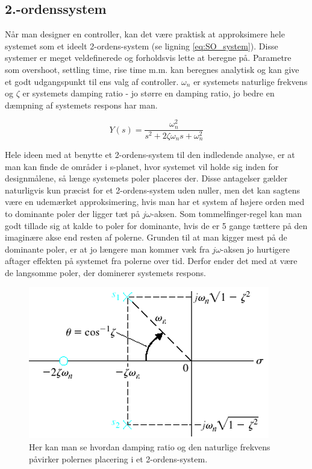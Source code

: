 \subsection{2.-ordenssystem}

Når man designer en controller, kan det være praktisk at approksimere hele systemet som et ideelt 2-ordens-system (se ligning \ref{eq:SO_system}). Disse systemer er meget veldefinerede og forholdsvis lette at beregne på. Parametre som overshoot, settling time, rise time m.m. kan beregnes analytisk og kan give et godt udgangspunkt til ens valg af controller. $\omega_{n}$ er systemets naturlige frekvens og $\zeta$ er systemets damping ratio - jo større en damping ratio, jo bedre en dæmpning af systemets respons har man.

\begin{equation}\label{eq:SO_system}
Y(s)=\frac{\omega_{n}^2}{s^2+2\zeta\omega_{n}s+\omega_{n}^2}
\end{equation}

Hele ideen med at benytte et 2-ordens-system til den indledende analyse, er at man kan finde de områder i s-planet, hvor systemet vil holde sig inden for designmålene, så længe systemets poler placeres der. Disse antagelser gælder naturligvis kun præcist for et 2-ordens-system uden nuller, men det kan sagtens være en udemærket approksimering, hvis man har et system af højere orden med to dominante poler der ligger tæt på $j\omega$-aksen. Som tommelfinger-regel kan man godt tillade sig at kalde to poler for dominante, hvis de er 5 gange tættere på den imaginære akse end resten af polerne. Grunden til at man kigger mest på de dominante poler, er at jo længere man kommer væk fra $j\omega$-aksen jo hurtigere aftager effekten på systemet fra polerne over tid. Derfor ender det med at være de langsomme poler, der dominerer systemets respons.

\begin{figure}	
	\includegraphics[scale=0.5]{Billeder/Damping_Ratio.PNG}
	\centering
	\caption{Her kan man se hvordan damping ratio og den naturlige frekvens påvirker polernes placering i et 2-ordens-system.}
	\label{fig:SO_system}
\end{figure}
\lipsum[12]

